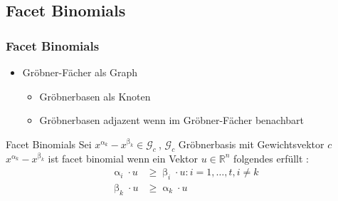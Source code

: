 \documentclass{beamer}
\begin{document}
\subsection{Facet Binomials}
\begin{frame}[<+->]
\frametitle{Facet Binomials }

\begin{itemize}
\item Gröbner-Fächer als Graph
~\\
\begin{itemize}
\item Gröbnerbasen als Knoten
\item Gröbnerbasen adjazent wenn im Gröbner-Fächer benachbart
\end{itemize}
\end{itemize}

\begin{block}{Facet Binomials}
Sei $x^{\upalpha_{k}}-x^{\upbeta_k} \in \mathcal{G}_c~$, $\mathcal{G}_c$ Gröbnerbasis mit Gewichtsvektor $c$\\
$x^{\upalpha_{k}}-x^{\upbeta_k}$ ist facet binomial wenn ein Vektor $u \in \mathbb{R}^{n}$ folgendes erfüllt : \\

\begin{align*}
   \upalpha_{i} \cdot u & \geq \upbeta_{i}  \cdot u : i = 1, \dots , t, i \neq k \\
   \upbeta_{k}  \cdot u & \geq \upalpha_{k}  \cdot u
\end{align*}


\end{block}

\end{frame}
\end{document}
